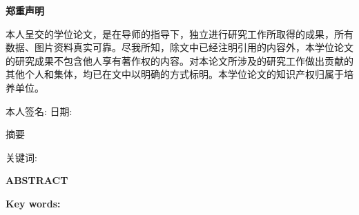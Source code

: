 \newpage
\thispagestyle{empty}
\renewcommand{\baselinestretch}{1.5}  %

\vspace*{44pt}
\begin{center}{\songti {} \textbf{郑重声明}}\end{center}
\par\vspace*{20pt}
\setlength{\baselineskip}{23pt}
{
  本人呈交的学位论文，是在导师的指导下，独立进行研究工作所取得的成果，所有数据、图片资料真实可靠。尽我所知，除文中已经注明引用的内容外，本学位论文的研究成果不包含他人享有著作权的内容。对本论文所涉及的研究工作做出贡献的其他个人和集体，均已在文中以明确的方式标明。本学位论文的知识产权归属于培养单位。
  \par
  \vspace*{88pt}
  \hspace*{0.5cm}本人签名: \underline{\hspace{3.5cm}}
  \hspace{2cm}日期: \underline{\hspace{3.5cm}}\hfill\par}


\newcommand\cnkeywords[1]{ {\noindent\heiti\zihao{-4} 关键词: }\zihao{-4}#1}
\newcommand\enkeywords[1]{ {\noindent\bfseries\zihao{-4} Key words: }\zihao{-4}#1}


\newpage
\thispagestyle{empty}
\vspace{10pt}
\begin{center}{\heiti {} 摘要}\end{center}
\baselineskip=23pt
{\songti {}%

  \the\CNabstract
}
\par
\vspace*{2em}
\cnkeywords{\the\CNkeywords}


\newpage
\thispagestyle{empty}
\vspace{10pt}
\begin{center}{ \textbf{ABSTRACT}}\end{center}
\baselineskip=23pt
{%

\the\ENabstract
}
\par
\vspace*{2em}
\enkeywords{\the\ENkeywords}
